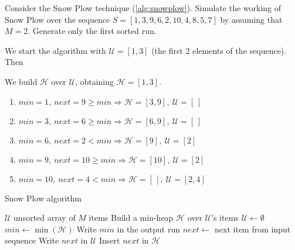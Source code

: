 \exercise

Consider the Snow Plow technique (\autoref{alg:snowplow}). Simulate the working
of Snow Plow over the sequence $S = [1, 3, 9, 6, 2, 10, 4, 8, 5, 7]$ by assuming
that $M = 2$. Generate only the first sorted run.

\solution

We start the algorithm with $\mathcal{U} = [1, 3]$ (the first 2 elements of the
sequence). Then
%
\begin{description}[labelindent=0.5cm]

  \item[Run 1.] We build $\mathcal{H}$ over $\mathcal{U}$, obtaining
  $\mathcal{H} = [1, 3]$.
  \begin{enumerate}

    \item $min = 1,\ next = 9 \ge min \Longrightarrow \mathcal{H} = [3, 9],\
    \mathcal{U} = [\,]$

    \item $min = 3,\ next = 6 \ge min \Longrightarrow \mathcal{H} = [6, 9],\
    \mathcal{U} = [\,]$

    \item $min = 6,\ next = 2 < min \Longrightarrow \mathcal{H} = [9],\
    \mathcal{U} = [2]$

    \item $min = 9,\ next = 10 \ge min \Longrightarrow \mathcal{H} = [10],\
    \mathcal{U} = [2]$

    \item $min = 10,\ next = 4 < min \Longrightarrow \mathcal{H} = [\,],\
    \mathcal{U} = [2, 4]$

  \end{enumerate}

\end{description}
%
\begin{algorithm}[b]
\caption{Snow Plow algorithm}\label{alg:snowplow}
\begin{algorithmic}[1]
\Require $\mathcal{U}$ unsorted array of $M$ items
\State Build a min-heap $\mathcal{H}$ over $\mathcal{U}$'s items
\State $\mathcal{U} \gets \emptyset$
\While{$\mathcal{H} \neq \emptyset$}
  \State $min \gets \min(\mathcal{H})$
  \State Write $min$ in the output run
  \State $next \gets$ next item from input sequence
  \If{$next < min$}
    \State Write $next$ in $\mathcal{U}$
  \Else
    \State Insert $next$ in $\mathcal{H}$
  \EndIf
\EndWhile
\end{algorithmic}
\end{algorithm}
